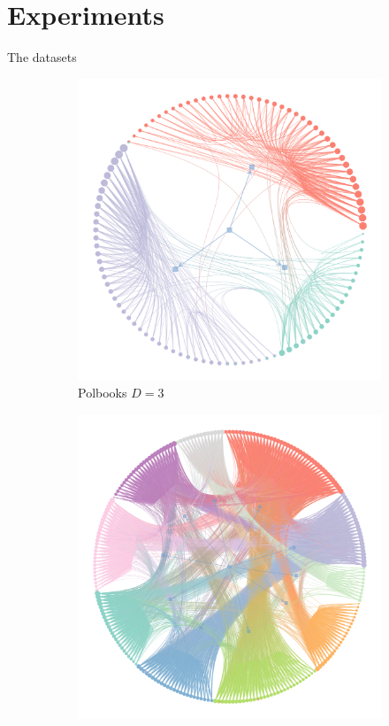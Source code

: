 \documentclass{beamer}
\begin{document}
\section{Experiments}

	\begin{frame}{The datasets}
		\begin{figure}[!h]
			\centering
			\begin{subfigure}[t]{0.3\linewidth}
				\centering
				\includegraphics[width=\linewidth]{polbooks-graph.png}
				\caption{Polbooks $D=3$}
				\label{fig:polbooks-graph}
			\end{subfigure}
			\hfill
			\begin{subfigure}[t]{0.3\linewidth}
				\centering
				\includegraphics[width=\linewidth]{school-graph.png}

\end{subfigure}
\end{figure}
\end{frame}
\end{document}
